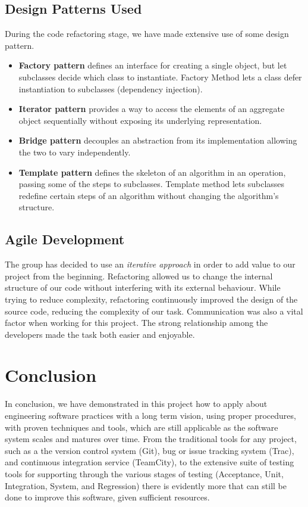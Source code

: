 \documentclass[11pt,twocolumn]{article} %
\begin{document}
\subsection{Design Patterns Used}
During the code refactoring stage, we have made extensive use of some design pattern.
\begin{itemize}
\item{{\bf Factory pattern} defines an interface for creating a single object, but let subclasses decide which class to instantiate. Factory Method lets a class defer instantiation to subclasses (dependency injection).}
\item{{\bf Iterator pattern} provides a way to access the elements of an aggregate object sequentially without exposing its underlying representation.}
\item{{\bf Bridge pattern} decouples an abstraction from its implementation allowing the two to vary independently.}
\item{{\bf Template pattern} defines the skeleton of an algorithm in an operation, passing some of the steps to subclasses.
Template method lets subclasses redefine certain steps of an algorithm without changing the algorithm's structure.}
\end{itemize}


\subsection{Agile Development}
The group has decided to use an \emph{iterative approach} in order to add value to our project from the beginning. 
Refactoring allowed us to change the internal structure of our code without interfering with its external behaviour. While trying to reduce complexity, refactoring continuously improved the design of the source code, reducing the complexity of our task.
Communication was also a vital factor when working for this project. The strong relationship among the developers made the task both 
easier and enjoyable.

\section{Conclusion}
In conclusion, we have demonstrated in this project how to apply about engineering software practices
with a long term vision, using proper procedures, with proven techniques and tools, which
are still applicable as the software system scales and matures over time.
From the traditional tools for any project, such as a the version control system (Git), bug
or issue tracking system (Trac), and continuous integration service (TeamCity), to
the extensive suite of testing tools for supporting through the various stages of testing (Acceptance, 
Unit, Integration, System, and Regression) there is evidently more
that can still be done to improve this software, given sufficient resources.
\end{document}

